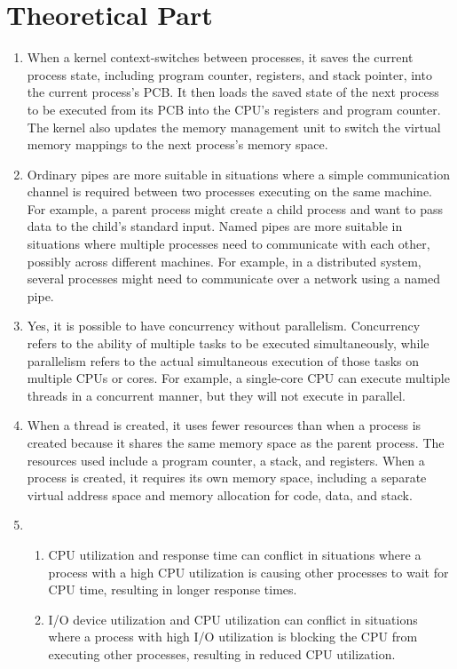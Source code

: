 \documentclass{article}
\begin{document}
\section{Theoretical Part}%
\begin{enumerate}
	\item When a kernel context-switches between processes, it saves the current process state, including program counter, registers, and stack pointer, into the current process's PCB. It then loads the saved state of the next process to be executed from its PCB into the CPU's registers and program counter. The kernel also updates the memory management unit to switch the virtual memory mappings to the next process's memory space.

	\item Ordinary pipes are more suitable in situations where a simple communication channel is required between two processes executing on the same machine. For example, a parent process might create a child process and want to pass data to the child's standard input. Named pipes are more suitable in situations where multiple processes need to communicate with each other, possibly across different machines. For example, in a distributed system, several processes might need to communicate over a network using a named pipe.

	\item Yes, it is possible to have concurrency without parallelism. Concurrency refers to the ability of multiple tasks to be executed simultaneously, while parallelism refers to the actual simultaneous execution of those tasks on multiple CPUs or cores. For example, a single-core CPU can execute multiple threads in a concurrent manner, but they will not execute in parallel.

	\item When a thread is created, it uses fewer resources than when a process is created because it shares the same memory space as the parent process. The resources used include a program counter, a stack, and registers. When a process is created, it requires its own memory space, including a separate virtual address space and memory allocation for code, data, and stack.

	\item
	      \begin{enumerate}
		      \item CPU utilization and response time can conflict in situations where a process with a high CPU utilization is causing other processes to wait for CPU time, resulting in longer response times.
		      \item I/O device utilization and CPU utilization can conflict in situations where a process with high I/O utilization is blocking the CPU from executing other processes, resulting in reduced CPU utilization.
	      \end{enumerate}


\end{enumerate}
\end{document}
